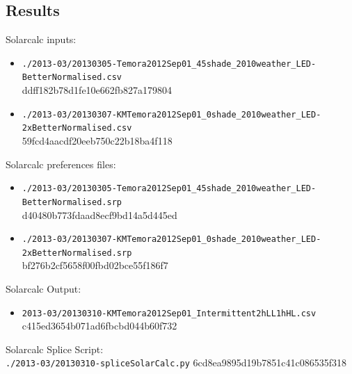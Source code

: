 \documentclass[12pt,a4paper]{book}
\begin{document}
    \subsection*{Results}
      Solarcalc inputs:
      \begin{itemize} \itemsep1pt \parskip0pt 
        \item \verb+./2013-03/20130305-Temora2012Sep01_45shade_2010weather_LED-BetterNormalised.csv+\\
          ddff182b78d1fe10e662fb827a179804
        \item \verb+./2013-03/20130307-KMTemora2012Sep01_0shade_2010weather_LED-2xBetterNormalised.csv+\\
          59fcd4aacdf20eeb750c22b18ba4f118
      \end{itemize}
      Solarcalc preferences files:
      \begin{itemize} \itemsep1pt \parskip0pt 
        \item \verb+./2013-03/20130305-Temora2012Sep01_45shade_2010weather_LED-BetterNormalised.srp+\\
          d40480b773fdaad8ecf9bd14a5d445ed
        \item \verb+./2013-03/20130307-KMTemora2012Sep01_0shade_2010weather_LED-2xBetterNormalised.srp+\\
          bf276b2cf5658f00fbd02bce55f186f7
      \end{itemize}
      Solarcalc Output:
      \begin{itemize} \itemsep1pt \parskip0pt 
        \item \verb+2013-03/20130310-KMTemora2012Sep01_Intermittent2hLL1hHL.csv+ \\
          c415ed3654b071ad6fbcbd044b60f732
      \end{itemize}
      Solarcalc Splice Script: \\
      \verb+./2013-03/20130310-spliceSolarCalc.py+ 6cd8ea9895d19b7851c41c086535f318\\
\end{document}
